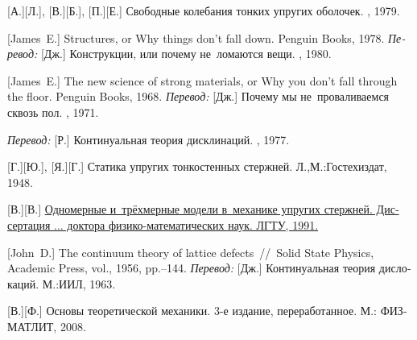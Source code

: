 \begin{thebibliography}{123}
\begin{otherlanguage}{russian}
[А.][Л.], [В.][Б.], [П.][Е.] Свободные ко\-леба\-ния тонких упругих оболочек. \naukapublisher, 1979. 

[James~E.] Structures, or Why things don’t fall down. Penguin Books, 1978. 
\emph{Перевод:}
[Дж.]
Конструкции, или почему не~ломаются вещи.
\mirpublisher,
1980.

[James~E.] The new science of strong materials, or Why you don’t fall through the floor. Penguin Books, 1968. 
\emph{Перевод:}
[Дж.]
Почему мы не~проваливаемся сквозь пол.
\mirpublisher,
1971.


\emph{Перевод:}
[Р.]
Континуальная теория дисклинаций.
\mirpublisher,
1977.

[Г.][Ю.], [Я.][Г.] Статика упругих тонкостенных стержней. Л.,\:М.:\;Гостехиздат, 1948. 

[В.][В.] \href{https://www.researchgate.net/publication/320895320_Odnomernye_i_trehmernye_modeli_v_mehanike_uprugih_sterznej}{Одномерные и~трёхмерные модели в~механике упругих стержней. Диссертация ... доктора
физико-математических наук.
ЛГТУ, 1991.}

[John~D.] The continuum theory of lattice defects~//~Solid State Physics, Academic Press, vol., 1956, pp.\hbox{--}144.
\emph{Перевод:} [Дж.] Континуальная теория дислокаций. М.:\;ИИЛ, 1963. 

[В.][Ф.]
Основы теоретической механики.
3-е издание, переработанное.
М.: ФИЗМАТЛИТ,
2008.


\end{otherlanguage}
\end{thebibliography}
